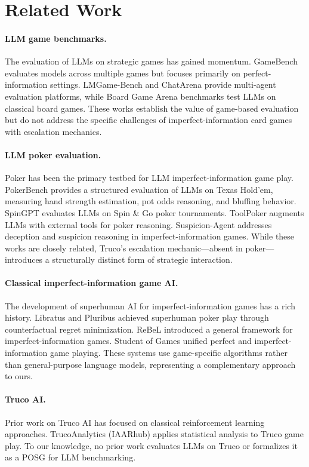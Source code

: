 \section{Related Work}

\paragraph{LLM game benchmarks.}
The evaluation of LLMs on strategic games has gained momentum. GameBench \citep{costarelli2024gamebench} evaluates models across multiple games but focuses primarily on perfect-information settings. LMGame-Bench \citep{hu2025lmgamebench} and ChatArena provide multi-agent evaluation platforms, while Board Game Arena benchmarks \citep{boardgamearena2025} test LLMs on classical board games. These works establish the value of game-based evaluation but do not address the specific challenges of imperfect-information card games with escalation mechanics.

\paragraph{LLM poker evaluation.}
Poker has been the primary testbed for LLM imperfect-information game play. PokerBench \citep{zhuang2025pokerbench} provides a structured evaluation of LLMs on Texas Hold'em, measuring hand strength estimation, pot odds reasoning, and bluffing behavior. SpinGPT \citep{maugin2025spingpt} evaluates LLMs on Spin \& Go poker tournaments. ToolPoker \citep{toolpoker2026} augments LLMs with external tools for poker reasoning. Suspicion-Agent \citep{guo2023suspicion} addresses deception and suspicion reasoning in imperfect-information games. While these works are closely related, Truco's escalation mechanic---absent in poker---introduces a structurally distinct form of strategic interaction.

\paragraph{Classical imperfect-information game AI.}
The development of superhuman AI for imperfect-information games has a rich history. Libratus \citep{brown2018libratus} and Pluribus achieved superhuman poker play through counterfactual regret minimization. ReBeL \citep{brown2020rebel} introduced a general framework for imperfect-information games. Student of Games unified perfect and imperfect-information game playing. These systems use game-specific algorithms rather than general-purpose language models, representing a complementary approach to ours.

\paragraph{Truco AI.}
Prior work on Truco AI has focused on classical reinforcement learning approaches. TrucoAnalytics (IAARhub) applies statistical analysis to Truco game play. To our knowledge, no prior work evaluates LLMs on Truco or formalizes it as a POSG for LLM benchmarking.
